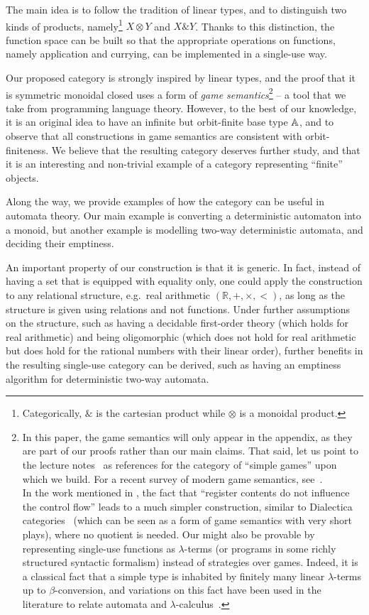 The main idea is to follow the tradition of linear types, and to  distinguish two kinds of products, namely\footnote{Categorically, $\&$ is the cartesian product while $\otimes$ is a monoidal product.} $X \otimes Y$ and $X \& Y$. Thanks to this distinction, the function space can be built so that the appropriate operations on functions, namely application and currying, can be implemented in a single-use way.

Our proposed category is strongly inspired by linear types, and the proof that it is symmetric monoidal closed uses a form of \emph{game semantics}\footnote{In this paper, the game semantics will only appear in the appendix, as they are part of our proofs rather than our main claims. That said, let us point to the lecture notes~\cite{abramsky2013semantics,Hyland1997} as references for the category of ``simple games'' upon which we build. For a recent survey of modern game semantics, see~\cite{ClairambaultHDR}.\\
  In the work mentioned in , the fact that ``register contents do not influence the control flow'' leads to a much simpler construction, similar to Dialectica categories~\cite{PaivaDialectica} (which can be seen as a form of game semantics with very short plays), where no quotient is needed. Our  might also be provable by representing single-use functions as $\lambda$-terms (or programs in some richly structured syntactic formalism) instead of strategies over games. Indeed, it is a classical fact that a simple type is inhabited by finitely many linear $\lambda$-terms up to $\beta$-conversion, and variations on this fact have been used in the literature to relate automata and $\lambda$-calculus~\cite{IATLC,LambdaTransducer}.} -- a tool that we take from programming language theory. However, to the best of our knowledge, it is an original idea to have an infinite but orbit-finite base type $\mathbb A$, and to observe that all constructions in game semantics are consistent with orbit-finiteness. We believe that the resulting category deserves further study, and that it is an interesting and non-trivial example of a category representing ``finite'' objects.

Along the way, we provide examples of how the category can be useful in automata theory. Our main example is converting a deterministic automaton into a monoid, but another example is modelling two-way deterministic automata, and deciding their emptiness. 

An important property of our construction is that it is generic. In fact, instead of having a set that is equipped with equality only, one could apply the construction to any relational structure, e.g.~real arithmetic $(\mathbb R, +, \times, <)$, as long as the structure is given using relations and not functions. Under further assumptions on the structure, such as having a decidable first-order theory (which holds for real arithmetic) and being oligomorphic (which does not hold for real arithmetic but does hold for the rational numbers with their linear order), further benefits in the resulting single-use category can be derived, such as having an emptiness algorithm for deterministic two-way automata. 

